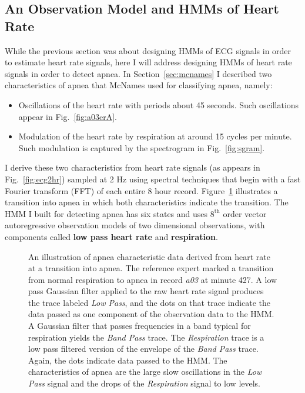 \afterpage{\clearpage}%

\subsection{An Observation Model and HMMs of Heart Rate}
\label{sec:apnea_observation_model}

While the previous section was about designing HMMs of ECG signals in
order to estimate heart rate signals, here I will address designing
HMMs of heart rate signals in order to detect apnea.  In
Section~\ref{sec:mcnames} I described two characteristics of apnea
that McNames used for classifying apnea, namely:
\begin{itemize}
\item Oscillations of the heart rate with periods about 45 seconds.
  Such oscillations appear in Fig.~\ref{fig:a03erA}.
\item Modulation of the heart rate by respiration at around 15 cycles
  per minute. Such modulation is captured by the spectrogram in
  Fig.~\ref{fig:sgram}.
\end{itemize}
I derive these two characteristics from heart rate signals (as appears
in Fig.~\ref{fig:ecg2hr}) sampled at 2 Hz using spectral techniques
that begin with a fast Fourier transform (FFT) of each entire 8 hour
record.  Figure~\ref{fig:explore} illustrates a transition into apnea
in which both characteristics indicate the transition.  The HMM I
built for detecting apnea has six states and uses $8^{\text{th}}$
order vector autoregressive observation models of two dimensional
observations, with components called \textbf{low pass heart rate} and
\textbf{respiration}.

\begin{figure}
  \caption[Apnea characteristics derived from estimated heart rate
  signal.]{An illustration of apnea characteristic data derived from
    heart rate at a transition into apnea.  The reference expert
    marked a transition from normal respiration to apnea in record
    \emph{a03} at minute 427.  A low pass Gaussian filter applied to
    the raw heart rate signal produces the trace labeled \emph{Low
      Pass}, and the dots on that trace indicate the data passed as
    one component of the observation data to the HMM.  A Gaussian
    filter that passes frequencies in a band typical for respiration
    yields the \emph{Band Pass} trace.  The \emph{Respiration} trace
    is a low pass filtered version of the envelope of the \emph{Band
      Pass} trace.  Again, the dots indicate data passed to the HMM.
    The characteristics of apnea are the large slow oscillations in
    the \emph{Low Pass} signal and the drops of the \emph{Respiration}
    signal to low levels.}
  \label{fig:explore}
\end{figure}

